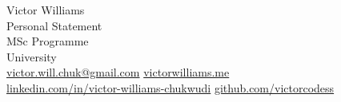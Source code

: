 \documentclass[11pt,a4paper]{article}
\newcommand{\programme}{MSc Programme}
\newcommand{\university}{University}
\begin{document}
\begin{center}
{\Large Victor Williams}\\[0.4em]
Personal Statement\\[0.15em]
\programme\\
\university\\[0.4em]
{\small
\href{mailto:victor.will.chuk@gmail.com}{victor.will.chuk@gmail.com}
\quad
\href{https://www.victorwilliams.me/}{victorwilliams.me}\\[0.15em]
\href{https://www.linkedin.com/in/victor-williams-chukwudi/}{linkedin.com/in/victor-williams-chukwudi}
\quad
\href{https://github.com/victorcodess}{github.com/victorcodess}
}
\end{center}

\vspace{0.2em}

\end{document}
